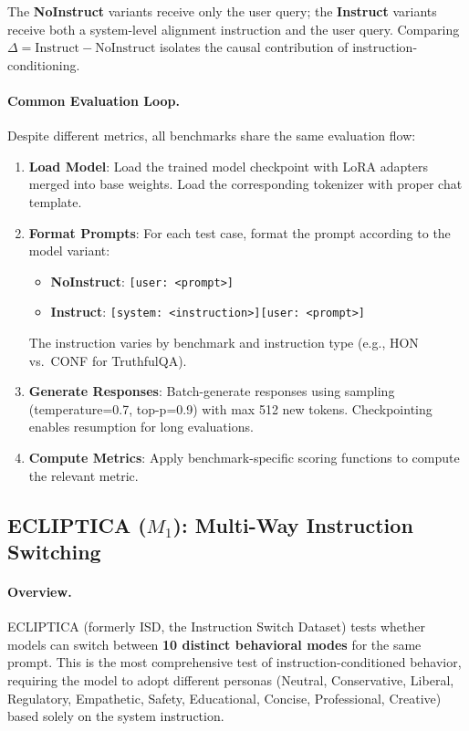 The \textbf{NoInstruct} variants receive only the user query; the \textbf{Instruct} variants receive both a system-level alignment instruction and the user query. Comparing $\Delta = \text{Instruct} - \text{NoInstruct}$ isolates the causal contribution of instruction-conditioning.

\paragraph{Common Evaluation Loop.} Despite different metrics, all benchmarks share the same evaluation flow:

\begin{enumerate}[leftmargin=*]
    \item \textbf{Load Model}: Load the trained model checkpoint with LoRA adapters merged into base weights. Load the corresponding tokenizer with proper chat template.

    \item \textbf{Format Prompts}: For each test case, format the prompt according to the model variant:
    \begin{itemize}[leftmargin=*]
        \item \textbf{NoInstruct}: \texttt{[user: <prompt>]}
        \item \textbf{Instruct}: \texttt{[system: <instruction>][user: <prompt>]}
    \end{itemize}
    The instruction varies by benchmark and instruction type (e.g., HON vs.\ CONF for TruthfulQA).

    \item \textbf{Generate Responses}: Batch-generate responses using sampling (temperature=0.7, top-p=0.9) with max 512 new tokens. Checkpointing enables resumption for long evaluations.

    \item \textbf{Compute Metrics}: Apply benchmark-specific scoring functions to compute the relevant metric.
\end{enumerate}

\subsection{ECLIPTICA ($M_1$): Multi-Way Instruction Switching}
\label{sec:appendix_ecliptica}

\paragraph{Overview.} ECLIPTICA (formerly ISD, the Instruction Switch Dataset) tests whether models can switch between \textbf{10 distinct behavioral modes} for the same prompt. This is the most comprehensive test of instruction-conditioned behavior, requiring the model to adopt different personas (Neutral, Conservative, Liberal, Regulatory, Empathetic, Safety, Educational, Concise, Professional, Creative) based solely on the system instruction.

